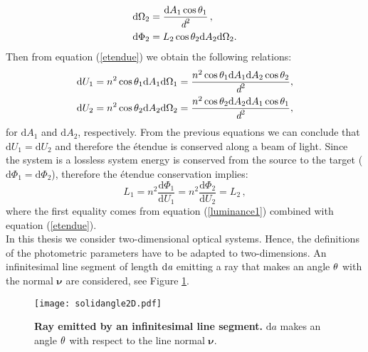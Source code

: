 \begin{subequations}\begin{align}\label{eq:omega2}
\textrm{d}\Omega_2 &= \frac{\textrm{d}A_1\cos\theta_1}{\textit{d}^2}\,,\\
\textrm{d}\Phi_2 &= L_2 \cos\theta_2 \textrm{d}A_2 \textrm{d}\Omega_2.\label{eq:phi2}
\end{align}
\end{subequations}
Then from equation (\ref{etendue}) we obtain the following relations: 
\begin{subequations}
\begin{align}
\textrm{d}U_1 &= n^2\cos\theta_1 \textrm{d}A_1\textrm{d}\Omega_1= \frac{n^2\cos\theta_1 \textrm{d}A_1\textrm{d}A_2\cos\theta_2}{\textit{d}^2},\\
\textrm{d}U_2 &= n^2 \cos\theta_2\textrm{d}A_2\textrm{d}\Omega_2= \frac{ n^2 \cos\theta_2\textrm{d}A_2\textrm{d}A_1\cos\theta_1}{\textit{d}^2}, \label{eq:dU2}
\end{align}
\end{subequations}
for $\textrm{d}A_1$ and $\textrm{d}A_2$, respectively.
From the previous equations we can conclude that $\textrm{d}U_1=\textrm{d}U_2$ and therefore the \'{e}tendue is conserved along a beam of light. 
Since the system is a lossless system energy is conserved from the source to the target ($\textrm{d}\Phi_1= \textrm{d}\Phi_2$), therefore the \'{e}tendue conservation implies:
\begin{equation}\label{basicluminance}
L_1 = n^2 \frac{\textrm{d}\Phi_1}{\textrm{d}U_1} = n^2 \frac{\textrm{d}\Phi_2}{\textrm{d}U_2} = L_2\,,
\end{equation}
where the first equality comes from equation (\ref{luminance1}) combined with equation (\ref{etendue}).
\\ \indent In this thesis we consider two-dimensional optical systems. 
 Hence, the definitions of the photometric parameters have to be adapted to two-dimensions. An infinitesimal line segment of length $\textrm{d}\textit{a}$ emitting a ray that makes an angle $\theta$ with the normal $\boldsymbol{\nu}$ are considered, see Figure \ref{fig:2Dsolidangle}. 
\begin{figure}[t]
 \label{fig:2Dsolidangle}
     \begin{center}
     \texttt{[image: solidangle2D.pdf]}
     \end{center}
     \caption{\textbf{Ray emitted by an infinitesimal line segment.} $\textrm{d}a$ makes an angle $\theta$ with respect to the line normal $\boldsymbol{\nu}$.}
\label{fig:2Dsolidangle}
 \end{figure}
